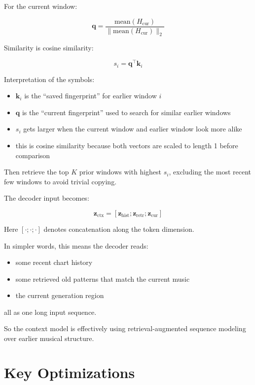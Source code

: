 \documentclass[11pt]{article}
\begin{document}
For the current window:

\[
\mathbf{q} = \frac{\mathrm{mean}(H_{\mathrm{cur}})}{\lVert \mathrm{mean}(H_{\mathrm{cur}}) \rVert_2}
\]

Similarity is cosine similarity:

\[
s_i = \mathbf{q}^{\top} \mathbf{k}_i
\]

Interpretation of the symbols:

\begin{itemize}[leftmargin=1.5em]
    \item $\mathbf{k}_i$ is the ``saved fingerprint'' for earlier window $i$
    \item $\mathbf{q}$ is the ``current fingerprint'' used to search for similar earlier windows
    \item $s_i$ gets larger when the current window and earlier window look more alike
    \item this is cosine similarity because both vectors are scaled to length 1 before comparison
\end{itemize}

Then retrieve the top $K$ prior windows with highest $s_i$, excluding the most recent few windows to avoid trivial copying.

The decoder input becomes:

\[
\mathbf{z}_{\mathrm{ctx}} = [\mathbf{z}_{\mathrm{hist}} ; \mathbf{z}_{\mathrm{retr}} ; \mathbf{z}_{\mathrm{cur}}]
\]

Here $[\cdot ; \cdot ; \cdot]$ denotes concatenation along the token dimension.

In simpler words, this means the decoder reads:

\begin{itemize}[leftmargin=1.5em]
    \item some recent chart history
    \item some retrieved old patterns that match the current music
    \item the current generation region
\end{itemize}

all as one long input sequence.

So the context model is effectively using retrieval-augmented sequence modeling over earlier musical structure.

\section*{Key Optimizations}
\end{document}
